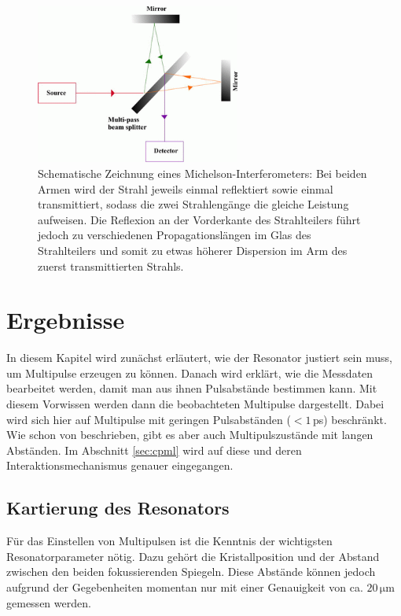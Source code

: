 \documentclass[bachelor,       %
               twoside,        %
               BCOR10mm,       %
               liststotoc,nomtotoc,bibtotoc, %
               english,ngerman, %
               final,          %
               ]{GAUBM}
\begin{document}
\begin{figure}[!htb]
	\centering
	\includegraphics[width=0.6\textwidth]{figures/multi_pass_beam_splitter.png}
	\caption{Schematische Zeichnung eines Michelson-Interferometers\protect\footnotemark:
	Bei beiden Armen wird der Strahl jeweils einmal reflektiert sowie einmal transmittiert, sodass die zwei Strahlengänge die gleiche Leistung aufweisen.
	Die Reflexion an der Vorderkante des Strahlteilers führt jedoch zu verschiedenen Propagationslängen im Glas des Strahlteilers und somit zu etwas höherer Dispersion im Arm des zuerst transmittierten Strahls.}
	\label{fig:Beamsplitter}
\end{figure}

\chapter{Ergebnisse}
In diesem Kapitel wird zunächst erläutert, wie der Resonator justiert sein muss, um Multipulse erzeugen zu können.
Danach wird erklärt, wie die Messdaten bearbeitet werden, damit man aus ihnen Pulsabstände bestimmen kann.
Mit diesem Vorwissen werden dann die beobachteten Multipulse dargestellt.
Dabei wird sich hier auf Multipulse mit geringen Pulsabständen ($< 1\,$ps) beschränkt.
Wie schon von \cite{lai_multiple_1997} beschrieben, gibt es aber auch Multipulszustände mit langen Abständen.
Im Abschnitt \ref{sec:cpml} wird auf diese und deren Interaktionsmechanismus genauer eingegangen.

\section{Kartierung des Resonators}
Für das Einstellen von Multipulsen ist die Kenntnis der wichtigsten Resonatorparameter nötig.
Dazu gehört die Kristallposition und der Abstand zwischen den beiden fokussierenden Spiegeln.
Diese Abstände können jedoch aufgrund der Gegebenheiten momentan nur mit einer Genauigkeit von ca. $20\,\si{\micro\meter}$ gemessen werden.
\end{document}
